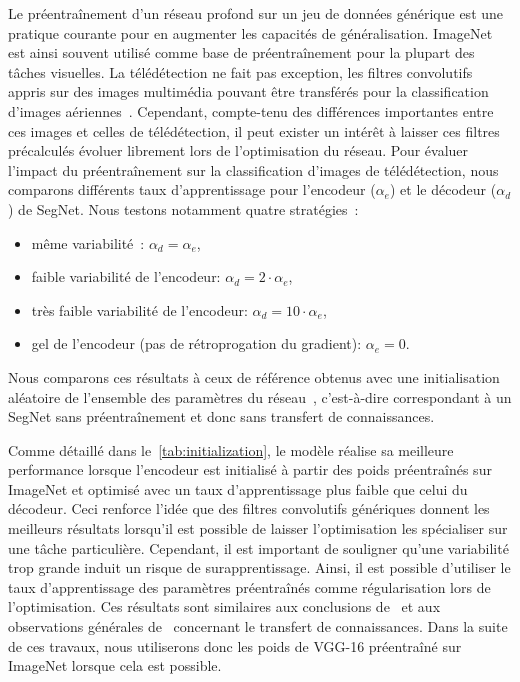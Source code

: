Le préentraînement d'un réseau profond sur un jeu de données générique est une pratique courante pour en augmenter les capacités de généralisation. ImageNet est ainsi souvent utilisé comme base de préentraînement pour la plupart des tâches visuelles. La télédétection ne fait pas exception, les filtres convolutifs appris sur des images multimédia pouvant être transférés pour la classification d'images aériennes~\cite{penatti_deep_2015}. Cependant, compte-tenu des différences importantes entre ces images et celles de télédétection, il peut exister un intérêt à laisser ces filtres précalculés évoluer librement lors de l'optimisation du réseau. Pour évaluer l'impact du préentraînement sur la classification d'images de télédétection, nous comparons différents taux d'apprentissage pour l'encodeur ($\alpha_{e}$) et le décodeur ($\alpha_{d}$) de SegNet. Nous testons notamment quatre stratégies~:
\begin{itemize}
  \item même variabilité~: $\alpha_{d} = \alpha_{e}$, %
  \item faible variabilité de l'encodeur: $\alpha_{d} = 2 \cdot \alpha_{e}$, %
  \item très faible variabilité de l'encodeur: $\alpha_{d} = 10 \cdot \alpha_{e}$, %
  \item gel de l'encodeur (pas de rétroprogation du gradient): $\alpha_{e} = 0$. %
\end{itemize}

Nous comparons ces résultats à ceux de référence obtenus avec une initialisation aléatoire de l'ensemble des paramètres du réseau~\cite{he_delving_2015}, c'est-à-dire correspondant à un SegNet sans préentraînement et donc sans transfert de connaissances.

Comme détaillé dans le~\cref{tab:initialization}, le modèle réalise sa meilleure performance lorsque l'encodeur est initialisé à partir des poids préentraînés sur ImageNet et optimisé avec un taux d'apprentissage plus faible que celui du décodeur. Ceci renforce l'idée que des filtres convolutifs génériques donnent les meilleurs résultats lorsqu'il est possible de laisser l'optimisation les spécialiser sur une tâche particulière. Cependant, il est important de souligner qu'une variabilité trop grande induit un risque de surapprentissage. Ainsi, il est possible d'utiliser le taux d'apprentissage des paramètres préentraînés comme régularisation lors de l'optimisation. Ces résultats sont similaires aux conclusions de~\citet{nogueira_towards_2016} et aux observations générales de~\citet{yosinski_how_2014} concernant le transfert de connaissances. Dans la suite de ces travaux, nous utiliserons donc les poids de VGG-16 préentraîné sur ImageNet lorsque cela est possible.

